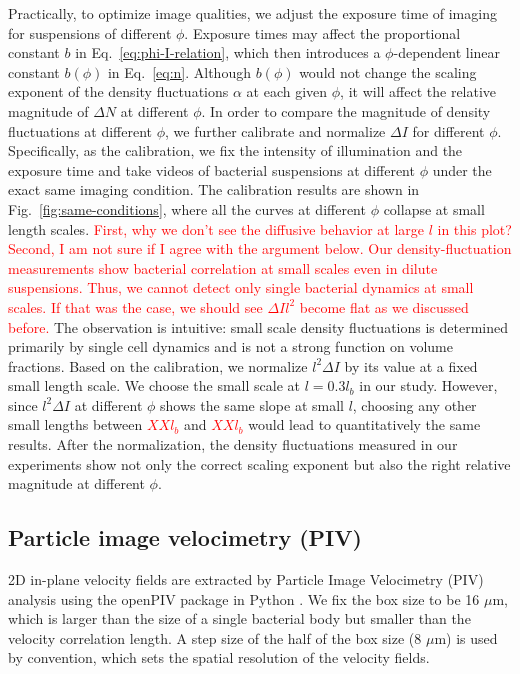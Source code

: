 \documentclass[twocolumn,aps,prx,amsmath,amssymb,longbibliography]{revtex4-2}
\begin{document}
Practically, to optimize image qualities, we adjust the exposure time of imaging for suspensions of different $\phi$. Exposure times may affect the proportional constant $b$ in Eq.~\ref{eq:phi-I-relation}, which then introduces a $\phi$-dependent linear constant $b(\phi)$ in Eq.~\ref{eq:n}. Although $b(\phi)$ would not change the scaling exponent of the density fluctuations $\alpha$ at each given $\phi$, it will affect the relative magnitude of $\Delta N$ at different $\phi$. In order to compare the magnitude of density fluctuations at different $\phi$,  we further calibrate and normalize $\Delta I$ for different $\phi$. Specifically, as the calibration, we fix the intensity of illumination and the exposure time and take videos of bacterial suspensions at different $\phi$ under the exact same imaging condition. The calibration results are shown in Fig.~\ref{fig:same-conditions}, where all the curves at different $\phi$ collapse at small length scales. \textcolor{red}{First, why we don't see the diffusive behavior at large $l$ in this plot? Second, I am not sure if I agree with the argument below. Our density-fluctuation measurements show bacterial correlation at small scales even in dilute suspensions. Thus, we cannot detect only single bacterial dynamics at small scales. If that was the case, we should see $\Delta I l^2$ become flat as we discussed before.} The observation is intuitive: small scale density fluctuations is determined primarily by single cell dynamics and is not a strong function on volume fractions. Based on the calibration, we normalize $l^2 \Delta I$ by its value at a fixed small length scale. We choose the small scale at $l = 0.3l_b$ in our study. However, since $l^2 \Delta I$ at different $\phi$ shows the same slope at small $l$, choosing any other small lengths between \textcolor{red}{$XXl_b$} and \textcolor{red}{$XXl_b$} would lead to quantitatively the same results. After the normalization, the density fluctuations measured in our experiments show not only the correct scaling exponent but also the right relative magnitude at different $\phi$.


\subsection{Particle image velocimetry (PIV)}

2D in-plane velocity fields are extracted by Particle Image Velocimetry (PIV) analysis using the openPIV package in Python \cite{Liberzon2020}. %
We fix the box size to be 16 $\mu$m, which is larger than the size of a single bacterial body but smaller than the velocity correlation length. A step size of the half of the box size (8 $\mu$m) is used by convention, which sets the spatial resolution of the velocity fields.
\end{document}
